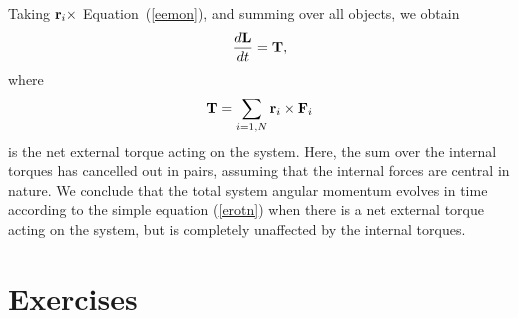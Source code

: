 Taking ${\bf r}_i\times$ Equation~(\ref{eemon}), and summing over all objects, we obtain
\begin{equation}\label{erotn}
\frac{d{\bf L}}{dt} = {\bf T},
\end{equation}
where
\begin{equation}
{\bf T} = \sum_{i=1,N} {\bf r}_i\times {\bf F}_i
\end{equation}
is the net external torque acting on the system. Here, the sum over the internal
torques has cancelled out in pairs, assuming that the internal forces are central in nature.
We conclude that the total system angular momentum  evolves in time according to the simple equation (\ref{erotn})
when there is a net external torque acting on the system, but is completely unaffected by the internal torques. 

\section{Exercises}

